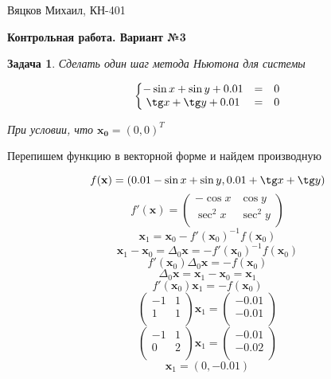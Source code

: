 \documentclass[11pt,a4paper,oneside]{article}
\begin{document}
	
\newtheorem{problem}{Задача}

\begin{center}
	{Вяцков Михаил, КН-401}
	
	{\huge \bf Контрольная работа. Вариант №3 }
\end{center}

\begin{problem}
Сделать один шаг метода Ньютона для системы

$$ \left\{\begin{matrix}
	-\sin x + \sin y + 0.01 & = & 0 \\
	\tg x + \tg y + 0.01 & = & 0 \\
\end{matrix}\right. $$
	
При условии, что $\mathbf{x_0} = (0, 0)^T$	
\end{problem}

Перепишем функцию в векторной форме и найдем производную

$$ f(\mathbf{x}) = (0.01 - \sin x + \sin y, 0.01 + \tg x + \tg y) $$
$$ f'(\mathbf{x}) = \left(\begin{matrix}
	- \cos x & \cos y \\
	\sec^2 x & \sec^2 y \\
\end{matrix}\right) $$
$$ \mathbf{x}_1 = \mathbf{x}_0 - f'(\mathbf{x}_0)^{-1} f(\mathbf{x}_0) $$
$$ \mathbf{x}_1 - \mathbf{x}_0 = \varDelta_0 \mathbf{x} = - f'(\mathbf{x}_0)^{-1} f(\mathbf{x}_0) $$
$$ f'(\mathbf{x}_0) \varDelta_0 \mathbf{x} = - f(\mathbf{x}_0) $$
$$ \varDelta_0 \mathbf{x} = \mathbf{x}_1 - \mathbf{x}_0 = \mathbf{x}_1 $$
$$ f'(\mathbf{x}_0) \mathbf{x}_1 = - f(\mathbf{x}_0) $$
$$ \left(\begin{matrix}
	 -1 & 1 \\
	 1 & 1 \\
\end{matrix}\right) \mathbf{x}_1 =
\left(\begin{matrix}
	- 0.01 \\
	- 0.01 \\
\end{matrix}\right) $$
$$ \left(\begin{matrix}
	-1 & 1 \\
	0 & 2 \\
\end{matrix}\right) \mathbf{x}_1 =
\left(\begin{matrix}
	- 0.01 \\
	- 0.02 \\
\end{matrix}\right) $$
$$ \mathbf{x}_1 = (0, -0.01) $$
\end{document}
